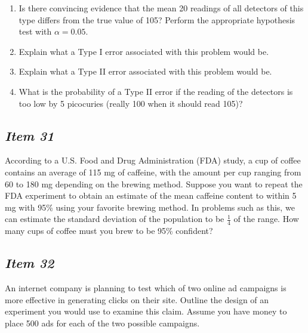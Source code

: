 \renewcommand{\labelenumi}{\arabic{enumi}.}





\begin{enumerate}[leftmargin=1cm, itemsep=.2em]


\item Is there convincing evidence that the mean 20 readings of all detectors of this type differs from the true value of 105? Perform the appropriate hypothesis test with $\alpha = 0.05$.


\item Explain what a Type I error associated with this problem would be.


\item Explain what a Type II error associated with this problem would be.


\item What is the probability of a Type II error if the reading of the detectors is too low by 5 picocuries (really 100 when it should read 105)?


\end{enumerate}








\subsection{\textbf{\textit{Item 31}}}


According to a U.S. Food and Drug Administration (FDA) study, a cup of coffee contains an average of 115 mg of caffeine, with the amount per cup ranging from 60 to 180 mg depending on the brewing method. Suppose you want to repeat the FDA experiment to obtain an estimate of the mean caffeine content to within 5 mg with 95\% using your favorite brewing method. In problems such as this, we can estimate the standard deviation of the population to be $\frac{1}{4}$ of the range. How many cups of coffee must you brew to be 95\% confident? 





\subsection{\textbf{\textit{Item 32}}}


An internet company is planning to test which of two online ad campaigns is more effective in generating clicks on their site. Outline the design of an experiment you would use to examine this claim. Assume you have money to place 500 ads for each of the two possible campaigns.





